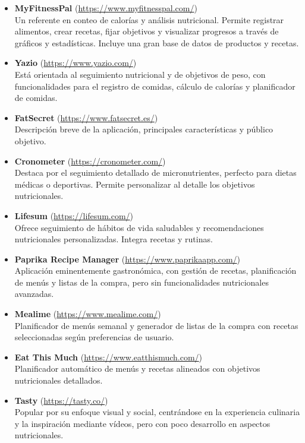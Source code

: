 \begin{itemize}
  \item \textbf{MyFitnessPal} (\url{https://www.myfitnesspal.com/})\\
  Un referente en conteo de calorías y análisis nutricional. Permite registrar alimentos, crear recetas, fijar objetivos y visualizar progresos a través de gráficos y estadísticas. Incluye una gran base de datos de productos y recetas.

  \item \textbf{Yazio} (\url{https://www.yazio.com/})\\
  Está orientada al seguimiento nutricional y de objetivos de peso, con funcionalidades para el registro de comidas, cálculo de calorías y planificador de comidas.

  \item \textbf{FatSecret} (\url{https://www.fatsecret.es/})\\
  Descripción breve de la aplicación, principales características y público objetivo.

  \item \textbf{Cronometer} (\url{https://cronometer.com/})\\
  Destaca por el seguimiento detallado de micronutrientes, perfecto para dietas médicas o deportivas. Permite personalizar al detalle los objetivos nutricionales.

  \item \textbf{Lifesum} (\url{https://lifesum.com/})\\
  Ofrece seguimiento de hábitos de vida saludables y recomendaciones nutricionales personalizadas. Integra recetas y rutinas.

  \item \textbf{Paprika Recipe Manager} (\url{https://www.paprikaapp.com/})\\
  Aplicación eminentemente gastronómica, con gestión de recetas, planificación de menús y listas de la compra, pero sin funcionalidades nutricionales avanzadas.

  \item \textbf{Mealime} (\url{https://www.mealime.com/})\\
  Planificador de menús semanal y generador de listas de la compra con recetas seleccionadas según preferencias de usuario.

  \item \textbf{Eat This Much} (\url{https://www.eatthismuch.com/})\\
  Planificador automático de menús y recetas alineados con objetivos nutricionales detallados.

  \item \textbf{Tasty} (\url{https://tasty.co/})\\
  Popular por su enfoque visual y social, centrándose en la experiencia culinaria y la inspiración mediante vídeos, pero con poco desarrollo en aspectos nutricionales.
\end{itemize}


